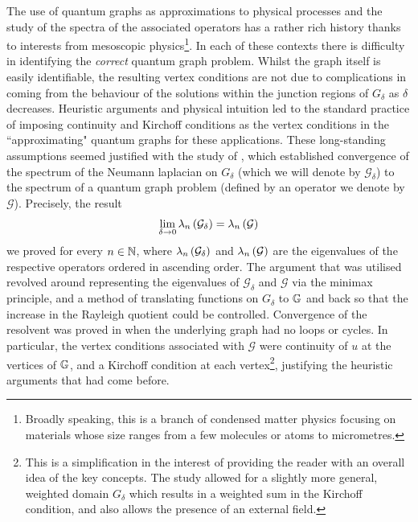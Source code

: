 The use of quantum graphs as approximations to physical processes and the study of the spectra of the associated operators has a rather rich history thanks  to interests from mesoscopic physics\footnote{Broadly speaking, this is a branch of condensed matter physics focusing on materials whose size ranges from a few molecules or atoms to micrometres.}.
In each of these contexts there is difficulty in identifying the \emph{correct} quantum graph problem. Whilst the graph itself is easily identifiable, the resulting vertex conditions are not due to complications in coming from the behaviour of the solutions within the junction regions of $G_{\delta}$ as $\delta$ decreases.
Heuristic arguments and physical intuition led to the standard practice of imposing continuity and Kirchoff conditions as the vertex conditions in the ``approximating" quantum graphs for these applications.
These long-standing assumptions seemed justified with the study of , which established convergence of the spectrum of the Neumann laplacian on $G_{\delta}$ (which we will denote by $\mathcal{G}_{\delta}$) to the spectrum of a quantum graph problem (defined by an operator we denote by $\mathcal{G}$).
Precisely, the result
\begin{align*}
	\lim_{\delta\rightarrow0} \lambda_n\left( \mathcal{G}_{\delta} \right) = \lambda_n\left( \mathcal{G} \right)
\end{align*}
we proved for every $n\in\mathbb{N}$, where $\lambda_n\left( \mathcal{G}_{\delta} \right)$ and $\lambda_n\left( \mathcal{G} \right)$ are the eigenvalues of the respective operators ordered in ascending order.
The argument that was utilised revolved around representing the eigenvalues of $\mathcal{G}_{\delta}$ and $\mathcal{G}$ via the minimax principle, and a method of translating functions on $G_{\delta}$ to $\mathbb{G}$ and back so that the increase in the Rayleigh quotient could be controlled.
Convergence of the resolvent was proved in  when the underlying graph had no loops or cycles.
In particular, the vertex conditions associated with $\mathcal{G}$ were continuity of $u$ at the vertices of $\mathbb{G}$, and a Kirchoff condition at each vertex\footnote{This is a simplification in the interest of providing the reader with an overall idea of the key concepts. The study \cite{kuchment2001convergence} allowed for a slightly more general, weighted domain $G_{\delta}$ which results in a weighted sum in the Kirchoff condition, and also allows the presence of an external field.}, justifying the heuristic arguments that had come before.

